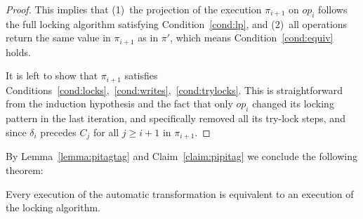 \begin{proof}
This implies that (1)~the projection of the execution $\pi_{i+1}$ on $op_{i}$
follows the full locking algorithm satisfying Condition~\ref{cond:lp}, and
(2)~all operations return the same value in $\pi_{i+1}$ as in $\pi'$, which
means Condition~\ref{cond:equiv} holds.

It is left to show that $\pi_{i+1}$ satisfies
Conditions~\ref{cond:locks},~\ref{cond:writes},~\ref{cond:trylocks}.
This is straightforward from the induction hypothesis and the fact that only
$op_{i}$ changed its locking pattern in the last iteration, and specifically
removed all its try-lock steps, and since $\delta_i$ precedes $C_{j}$ for all
$j\geq i+1$ in $\pi_{i+1}$.
 
\end{proof}

By Lemma~\ref{lemma:pitagtag} and Claim~\ref{claim:pipitag} we conclude the following
theorem:
\begin{theorem}
Every execution of the automatic transformation is equivalent to an
execution of the locking algorithm.
\end{theorem}
